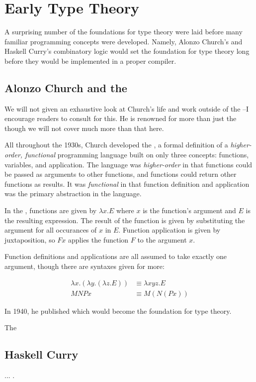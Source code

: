 \section{Early Type Theory}

A surprising number of the foundations for type theory were laid before
many familiar programming concepts were developed.
Namely, Alonzo Church's \lambdacalc and Haskell Curry's combinatory logic
would set the foundation for type theory long before they would be implemented in
a proper compiler.

\subsection{Alonzo Church and the \Lambdacalc}

We will not given an exhaustive look at Church's life and work outside of the
\lambdacalc--I encourage readers to consult 
for this.
He is renowned for more than just the \lambdacalc though we will not cover much more
than that here.

All throughout the 1930s, Church developed the \textit{\lambdacalc},
a formal definition of a \textit{higher-order, functional} programming language
built on only three concepts: functions, variables, and application.
The language was \textit{higher-order} in that functions could be passed
as arguments to other functions, and functions could return other functions as results.
It was \textit{functional} in that function definition and application was the
primary abstraction in the language.

In the \lambdacalc, functions are given by $\lambda x. E$ where $x$ is the function's argument
and $E$ is the resulting expression. The result of the function is given by substituting the
argument for all occurances of $x$ in $E$. Function application is given by juxtaposition,
so $F x$ applies the function $F$ to the argument $x$.

Function definitions and applications are all assumed to take exactly one argument,
though there are syntaxes given for more:

\begin{align}
	\lambda x . (\lambda y . (\lambda z . E)) & \equiv \lambda x y z . E
	\tag{function definition}
	\\
	M N P x                                   & \equiv M (N (P x))
	\tag{function application}
\end{align}

In 1940, he published 
which would become the foundation for type theory.

The \lambdacalc

\subsection{Haskell Curry}

...
.
